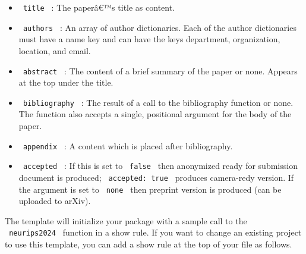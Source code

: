 \begin{itemize}
\tightlist
\item
  \texttt{\ title\ } : The paperâ€™s title as content.
\item
  \texttt{\ authors\ } : An array of author dictionaries. Each of the
  author dictionaries must have a name key and can have the keys
  department, organization, location, and email.
\item
  \texttt{\ abstract\ } : The content of a brief summary of the paper or
  none. Appears at the top under the title.
\item
  \texttt{\ bibliography\ } : The result of a call to the bibliography
  function or none. The function also accepts a single, positional
  argument for the body of the paper.
\item
  \texttt{\ appendix\ } : A content which is placed after bibliography.
\item
  \texttt{\ accepted\ } : If this is set to \texttt{\ false\ } then
  anonymized ready for submission document is produced;
  \texttt{\ accepted:\ true\ } produces camera-redy version. If the
  argument is set to \texttt{\ none\ } then preprint version is produced
  (can be uploaded to arXiv).
\end{itemize}

The template will initialize your package with a sample call to the
\texttt{\ neurips2024\ } function in a show rule. If you want to change
an existing project to use this template, you can add a show rule at the
top of your file as follows.

\begin{Shaded}
\begin{Highlighting}[]

\NormalTok{  abstract: [}
\NormalTok{  ],}
\NormalTok{  appendix: [}
\NormalTok{  ],}
\NormalTok{)}

\end{Highlighting}
\end{Shaded}

